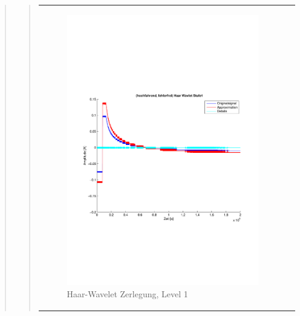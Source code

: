 \begin{quote}
\begin{quote}
\begin{center}
\begin{tabular}{ll}
\begin{minipage}{0.6\textwidth}
                        \begin{figure}[H]
                            \label{fig:}
                            \includegraphics[scale=0.4, trim = 2cm 6cm 1cm
                            7.5cm,
                            clip]{./Bilder/Termin8/fehlerfrei_hochlaufen_Haar_Wavlet_lvl_1}
                            \caption{Haar-Wavelet Zerlegung, Level 1}
                        \end{figure}
    
                    \end{minipage}
                    \begin{minipage}{0.6\textwidth}
    

\end{minipage}
\end{tabular}
\end{center}
\end{quote}
\end{quote}

